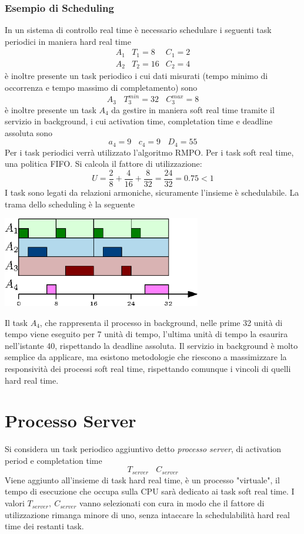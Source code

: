 \documentclass[10pt, letterpaper]{report}
\begin{document}
\subsubsection{Esempio di Scheduling}
In un sistema di controllo real time è necessario schedulare i seguenti task periodici in maniera hard real time 
$$ \begin{matrix}
    A_1 &   T_1 = 8 &  C_1 = 2 \\ 
    A_2 &   T_2 = 16 &  C_2 = 4
\end{matrix}$$
è inoltre presente un task periodico i cui dati misurati (tempo minimo di occorrenza e tempo massimo di completamento) sono
$$ A_3 \ \ \ \  T_3^{min}=32 \ \ \ \  C_3^{max}=8$$
è inoltre presente un task $A_4$ da gestire in maniera soft real time tramite il servizio in background, i cui activation time, completation time e deadline assoluta sono 
$$ a_4 = 9 \ \ \ \ c_4 = 9 \ \ \ \ D_4 = 55$$
Per i task periodici verrà utilizzato l'algoritmo RMPO. Per i task soft real time, una politica FIFO. Si calcola il fattore di utilizzazione: 
$$ U=\frac{2}{8}+\frac{4}{16}+\frac{8}{32}=\frac{24}{32}=0.75<1$$
I task sono legati da relazioni armoniche, sicuramente l'insieme è schedulabile. La trama dello scheduling è la seguente
\begin{center}
    \includegraphics[width=0.65\textwidth ]{images/esempioBackground.eps}
\end{center}
Il task $A_4$, che rappresenta il processo in background, nelle prime 32 unità di tempo viene eseguito per 7 unità di tempo, l'ultima unità di tempo la esaurira nell'istante 40, rispettando la deadline assoluta.
Il servizio in background è molto semplice da applicare, ma esistono metodologie che riescono a massimizzare la responsività dei processi soft real time, rispettando comunque i vincoli di quelli hard real time.\flowerLine 
\section{Processo Server}
Si considera un task periodico aggiuntivo detto \textit{processo server}, di activation period e completation time $$ T_{server} \ \ \ \ C_{server}$$
Viene aggiunto all'insieme di task hard real time, è un processo "virtuale", il tempo di esecuzione che occupa sulla CPU sarà dedicato ai task soft real time. I valori $T_{server}, \ C_{server}$ vanno selezionati con cura in modo che il fattore di utilizzazione rimanga minore di uno, senza intaccare la schedulabilità hard real time dei restanti task.
\end{document}
